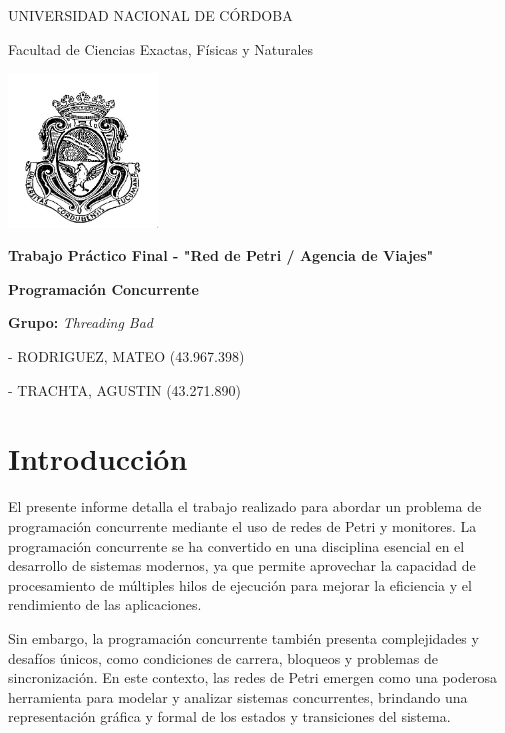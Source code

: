 \documentclass[12pt]{article}
\begin{document}
\begin{titlepage}
    \centering
    {\LARGE UNIVERSIDAD NACIONAL DE CÓRDOBA \par}
    \vspace{1cm}
    {\Large Facultad de Ciencias Exactas, Físicas y Naturales \par}
    \vspace{1.5cm}
    \includegraphics[width=0.3\textwidth]{Logo-UNC.jpg} \par
    \vspace{1.5cm}
    {\LARGE \textbf{Trabajo Práctico Final - "Red de Petri / Agencia de Viajes"} \par}
    \vspace{1cm}
    {\Large \textbf{Programación Concurrente} \par}
    \vfill
    \textbf{Grupo:} \textit{Threading Bad} \par
    \vspace{0.5cm}
    - RODRIGUEZ, MATEO (43.967.398) \par
    - TRACHTA, AGUSTIN (43.271.890) \par
    \vfill
\end{titlepage}

\section{Introducción}
El presente informe detalla el trabajo realizado para abordar un problema de programación concurrente mediante el uso de redes de Petri y monitores. La programación concurrente se ha convertido en una disciplina esencial en el desarrollo de sistemas modernos, ya que permite aprovechar la capacidad de procesamiento de múltiples hilos de ejecución para mejorar la eficiencia y el rendimiento de las aplicaciones.

Sin embargo, la programación concurrente también presenta complejidades y desafíos únicos, como condiciones de carrera, bloqueos y problemas de sincronización. En este contexto, las redes de Petri emergen como una poderosa herramienta para modelar y analizar sistemas concurrentes, brindando una representación gráfica y formal de los estados y transiciones del sistema.
\end{document}
